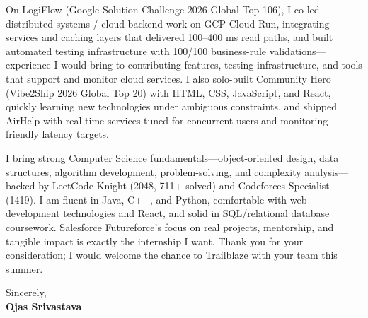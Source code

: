 \documentclass[a4paper,11pt]{article}
\begin{document}
On LogiFlow (Google Solution Challenge 2026 Global Top 106), I co-led distributed systems / cloud backend work on GCP Cloud Run, integrating services and caching layers that delivered 100--400 ms read paths, and built automated testing infrastructure with 100/100 business-rule validations---experience I would bring to contributing features, testing infrastructure, and tools that support and monitor cloud services. I also solo-built Community Hero (Vibe2Ship 2026 Global Top 20) with HTML, CSS, JavaScript, and React, quickly learning new technologies under ambiguous constraints, and shipped AirHelp with real-time services tuned for concurrent users and monitoring-friendly latency targets.

I bring strong Computer Science fundamentals---object-oriented design, data structures, algorithm development, problem-solving, and complexity analysis---backed by LeetCode Knight (2048, 711+ solved) and Codeforces Specialist (1419). I am fluent in Java, C++, and Python, comfortable with web development technologies and React, and solid in SQL/relational database coursework. Salesforce Futureforce's focus on real projects, mentorship, and tangible impact is exactly the internship I want. Thank you for your consideration; I would welcome the chance to Trailblaze with your team this summer.

Sincerely, \\
\vspace{8mm}
\textbf{Ojas Srivastava}
\end{document}

